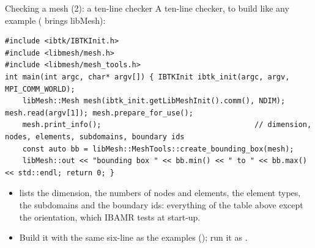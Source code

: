 \documentclass[aspectratio=169,11pt]{beamer}
\begin{document}
\begin{frame}[fragile]{Checking a mesh (2): a ten-line checker}
\label{fr:checks2}
\footnotesize
A ten-line checker, to build like any example ( brings libMesh):
\begin{lstlisting}[style=cpptiny]
#include <ibtk/IBTKInit.h>
#include <libmesh/mesh.h>
#include <libmesh/mesh_tools.h>
int main(int argc, char* argv[]) { IBTKInit ibtk_init(argc, argv, MPI_COMM_WORLD);
    libMesh::Mesh mesh(ibtk_init.getLibMeshInit().comm(), NDIM); mesh.read(argv[1]); mesh.prepare_for_use();
    mesh.print_info();                                   // dimension, nodes, elements, subdomains, boundary ids
    const auto bb = libMesh::MeshTools::create_bounding_box(mesh);
    libMesh::out << "bounding box " << bb.min() << " to " << bb.max() << std::endl; return 0; }
\end{lstlisting}
\begin{itemize}
  \item {} lists the dimension, the numbers of nodes and elements, the element types, the subdomains and the boundary ids: everything of the table above except the orientation, which IBAMR tests at start-up.
  \item Build it with the same six-line  as the examples (); run it as .
\end{itemize}
\end{frame}
\end{document}
